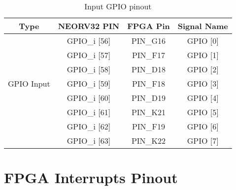 \begin{table}[!htb]\scriptsize
    \centering
    \begin{tabular}{c c c c}
        \toprule[1.5pt]
        \textbf{Type} & \quad \quad \textbf{NEORV32 PIN} & \quad \quad \textbf{FPGA Pin} & \quad \quad \textbf{Signal Name}  \\
          
        \midrule
                    & \quad \quad GPIO\_i [56] & \quad \quad PIN\_G16  & \quad \quad GPIO [0]\\
                    & \quad \quad GPIO\_i [57] & \quad \quad PIN\_F17  & \quad \quad GPIO [1]\\
                    & \quad \quad GPIO\_i [58] & \quad \quad PIN\_D18  & \quad \quad GPIO [2]\\
        GPIO Input  & \quad \quad GPIO\_i [59] & \quad \quad PIN\_F18  & \quad \quad GPIO [3]\\        
                    & \quad \quad GPIO\_i [60] & \quad \quad PIN\_D19  & \quad \quad GPIO [4]\\
                    & \quad \quad GPIO\_i [61] & \quad \quad PIN\_K21  & \quad \quad GPIO [5]\\
                    & \quad \quad GPIO\_i [62] & \quad \quad PIN\_F19  & \quad \quad GPIO [6]\\
                    & \quad \quad GPIO\_i [63] & \quad \quad PIN\_K22  & \quad \quad GPIO [7]\\

            \bottomrule[1.5pt]
         
    \end{tabular}
    \caption{\label{tab:gpio_i}Input GPIO pinout}
\end{table}


\chapter{FPGA Interrupts Pinout}

